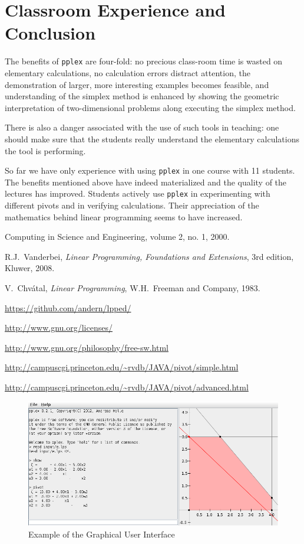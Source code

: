 \documentclass[ukenglish,a4]{article}
\begin{document}
\section{Classroom Experience and Conclusion}\label{sec:pedagogy}
The benefits of \texttt{pplex} are four-fold: 
no precious class-room time is wasted on elementary calculations, 
no calculation errors distract attention,
the demonstration of larger, more interesting examples becomes feasible, and 
understanding of the simplex method is enhanced by showing the geometric interpretation of 
two-dimensional problems along executing the simplex method.

There is also a danger associated with the use of such tools in teaching: 
one should make sure that the students really understand the elementary
calculations the tool is performing.

So far we have only experience with using \texttt{pplex} in one course with 11 students.
The benefits mentioned above have indeed materialized and the quality of the lectures has improved.
Students  actively use \texttt{pplex} in experimenting with different pivots and
in verifying calculations. Their appreciation of the mathematics behind
linear programming seems to have increased.



\begin{thebibliography}{99}
 Computing in Science and Engineering, volume 2, no. 1, 2000.

 R.J.~Vanderbei, 
\emph{Linear Programming, Foundations and Extensions},
3rd edition, Kluwer, 2008.

 V.~Chv\'atal,
\emph{Linear Programming},
W.H.~Freeman and Company, 1983.

\url{https://github.com/andern/lpped/}

\url{http://www.gnu.org/licenses/}

\url{http://www.gnu.org/philosophy/free-sw.html}

\url{http://campuscgi.princeton.edu/~rvdb/JAVA/pivot/simple.html}

\url{http://campuscgi.princeton.edu/~rvdb/JAVA/pivot/advanced.html}

\end{thebibliography}

\begin{figure}[htpb]
	\begin{center}
		\includegraphics[width=\textwidth]{ex_gui.jpg}
	\end{center}
	\caption{Example of the Graphical User Interface}
	\label{fig:ex_gui}
\end{figure}
\end{document}
